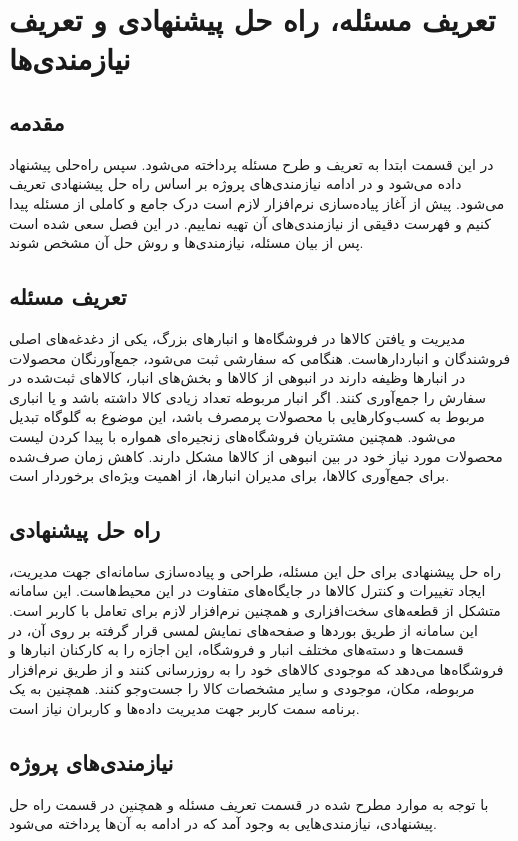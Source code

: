 \chapter{تعریف مسئله، راه حل پیشنهادی و تعریف نیازمندی‌ها}
\section{مقدمه}
در این قسمت ابتدا به تعریف و طرح مسئله پرداخته می‌شود. سپس راه‌حلی پیشنهاد داده می‌شود و در ادامه نیازمندی‌های پروژه بر اساس راه حل پیشنهادی تعریف می‌شود.
پیش از آغاز پیاده‌سازی نرم‌افزار لازم است درک جامع و کاملی از مسئله پیدا کنیم و فهرست دقیقی از نیازمندی‌های آن تهیه نماییم. در این فصل سعی شده است پس از بیان مسئله، نیازمندی‌ها و روش حل آن مشخص شوند.

\section{تعریف مسئله}
مدیریت و یافتن کالاها در فروشگاه‌ها و انبار‌های بزرگ، یکی از دغدغه‌های اصلی فروشندگان و انباردارهاست. هنگامی که سفارشی ثبت می‌شود، جمع‌آورنگان محصولات در انبارها وظیفه دارند در انبوهی از کالاها و بخش‌های انبار، کالاهای ثبت‌شده در سفارش را جمع‌آوری کنند. اگر انبار مربوطه تعداد زیادی کالا داشته باشد و یا انباری مربوط به کسب‌و‌کارهایی با محصولات پرمصرف باشد، این موضوع به گلوگاه تبدیل می‌شود. همچنین مشتریان فروشگاه‌های زنجیره‌ای همواره با پیدا کردن لیست محصولات مورد نیاز خود در بین انبوهی از کالاها مشکل دارند. کاهش زمان صرف‌شده برای جمع‌آوری کالاها، برای مدیران 
انبارها، از اهمیت ویژه‌ای برخوردار است.


\section{راه حل پیشنهادی} 
راه حل پیشنهادی برای حل این مسئله، طراحی و پیاده‌سازی سامانه‌ای جهت مدیریت، ایجاد تغییرات و کنترل کالاها در جایگاه‌های متفاوت در این محیط‌هاست. این سامانه متشکل از قطعه‌های سخت‌افزاری و همچنین نرم‌افزار لازم برای تعامل با کاربر است. این سامانه از طریق بوردها و صفحه‌های نمایش لمسی قرار گرفته بر روی آن، در قسمت‌ها و دسته‌های مختلف انبار و فروشگاه، این اجازه را به کارکنان انبارها و فروشگاه‌ها می‌دهد که موجودی کالا‌های خود را به روز‌رسانی کنند و از طریق نرم‌افزار مربوطه، مکان، موجودی و سایر مشخصات کالا را جست‌و‌جو کنند. همچنین به یک برنامه سمت کاربر جهت مدیریت داده‌ها و کاربران نیاز است.


\section{نیازمندی‌های پروژه}
با توجه به موارد مطرح شده در قسمت تعریف مسئله و همچنین در قسمت راه حل پیشنهادی، نیازمندی‌هایی به وجود آمد که در ادامه به آن‌ها پرداخته می‌شود.

